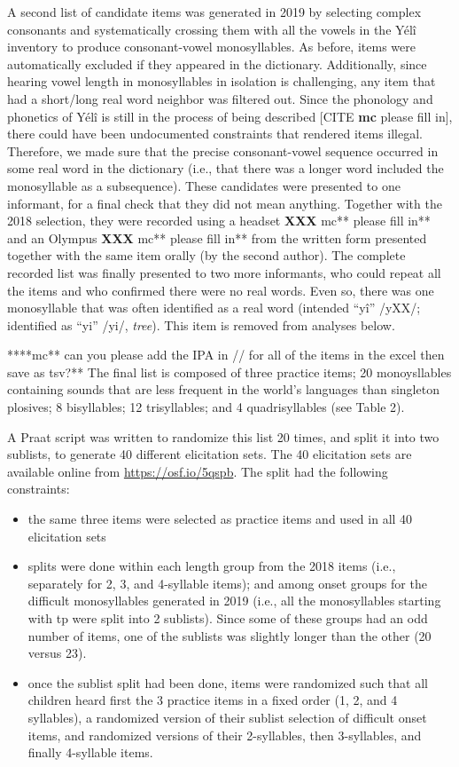 \documentclass[english,,man,floatsintext]{apa6}
\providecommand{\tightlist}{%
  \setlength{\itemsep}{0pt}\setlength{\parskip}{0pt}}
\begin{document}
A second list of candidate items was generated in 2019 by selecting complex consonants and systematically crossing them with all the vowels in the Yélî inventory to produce consonant-vowel monosyllables. As before, items were automatically excluded if they appeared in the dictionary. Additionally, since hearing vowel length in monosyllables in isolation is challenging, any item that had a short/long real word neighbor was filtered out. Since the phonology and phonetics of Yélî is still in the process of being described {[}CITE \textbf{mc} please fill in{]}, there could have been undocumented constraints that rendered items illegal. Therefore, we made sure that the precise consonant-vowel sequence occurred in some real word in the dictionary (i.e., that there was a longer word included the monosyllable as a subsequence). These candidates were presented to one informant, for a final check that they did not mean anything. Together with the 2018 selection, they were recorded using a headset \textbf{XXX }mc** please fill in** and an Olympus \textbf{XXX }mc** please fill in** from the written form presented together with the same item orally (by the second author). The complete recorded list was finally presented to two more informants, who could repeat all the items and who confirmed there were no real words. Even so, there was one monosyllable that was often identified as a real word (intended \enquote{yî} /yXX/; identified as \enquote{yi} /yi/, \emph{tree}). This item is removed from analyses below.

****mc** can you please add the IPA in // for all of the items in the excel then save as tsv?**
The final list is composed of three practice items; 20 monoysllables containing sounds that are less frequent in the world's languages than singleton plosives; 8 bisyllables; 12 trisyllables; and 4 quadrisyllables (see Table 2).

A Praat script was written to randomize this list 20 times, and split it into two sublists, to generate 40 different elicitation sets. The 40 elicitation sets are available online from \url{https://osf.io/5qspb}. The split had the following constraints:

\begin{itemize}
\tightlist
\item
  the same three items were selected as practice items and used in all 40 elicitation sets
\item
  splits were done within each length group from the 2018 items (i.e., separately for 2, 3, and 4-syllable items); and among onset groups for the difficult monosyllables generated in 2019 (i.e., all the monosyllables starting with tp were split into 2 sublists). Since some of these groups had an odd number of items, one of the sublists was slightly longer than the other (20 versus 23).
\item
  once the sublist split had been done, items were randomized such that all children heard first the 3 practice items in a fixed order (1, 2, and 4 syllables), a randomized version of their sublist selection of difficult onset items, and randomized versions of their 2-syllables, then 3-syllables, and finally 4-syllable items.
\end{itemize}
\end{document}
